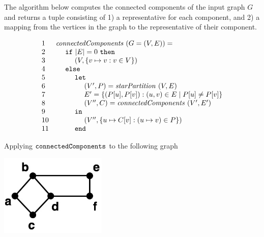 \begin{flex}

\begin{algorithm}
\label{alg:graphcon::connect::nc}

The algorithm below computes the connected components of the input
graph $G$ and returns a tuple consisting of
%
1) a representative for each component, and
2) a mapping from the vertices in the graph to the representative of their component. 
  
\[
\begin{array}{ll}
1 & \cdvar{connectedComponents}~(G = (V,E)) = 
\\
2 & ~~~~\cd{if}~|E| = 0~\cd{then}
\\ 
3 & ~~~~~~~~(V, \cset{v \mapsto v : v \in V})
\\
4 & ~~~~\cd{else}
\\ 
5 & ~~~~~~~~\cd{let}
\\
6 & ~~~~~~~~~~~~(V',P) = \cdvar{starPartition}~(V,E)
\\
7 & ~~~~~~~~~~~~E' = \csetf{(\cget{P}{u},\cget{P}{v}) : (u,v) \in E}{\cget{P}{u} \neq \cget{P}{v}}
\\
8 & ~~~~~~~~~~~~(V'',C) = \cdvar{connectedComponents}~(V',E')
\\
9 & ~~~~~~~~\cd{in}
\\
10 & ~~~~~~~~~~~~(V'', \cset{u \mapsto C[v] : (u \mapsto v) \in P}) %
\\
11 & ~~~~~~~~\cd{end}
\end{array}
\]
\end{algorithm}


\begin{example}
\label{ex:graphcon::connect::nc::1}

Applying $\texttt{connectedComponents}$ to the following graph

\begin{center}
\includegraphics[width=2.0in]{./graph-contraction/media-connectivity/contract-example1.jpg}
\end{center}


\end{example}
\end{flex}
